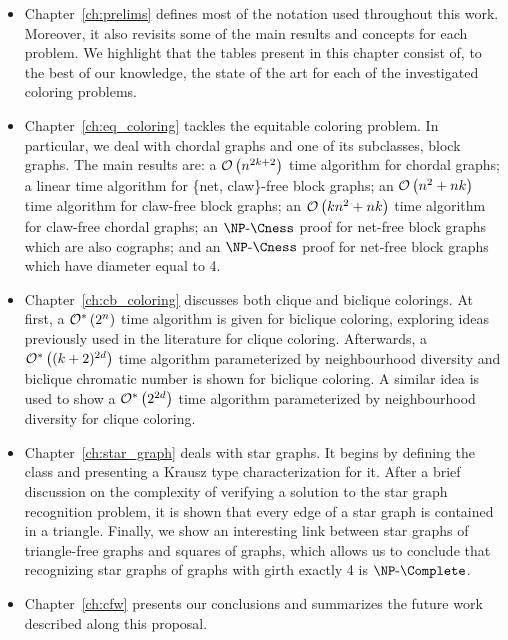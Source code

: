 \begin{itemize}
    \item Chapter~\ref{ch:prelims} defines most of the notation used throughout this work.
    Moreover, it also revisits some of the main results and concepts for each problem. 
    We highlight that the tables present in this chapter consist of, to the best of our knowledge, the state of the art for each of the investigated coloring problems.
    \item Chapter~\ref{ch:eq_coloring} tackles the equitable coloring problem. In particular, we deal with chordal graphs and one of its subclasses, block graphs.
    The main results are: a $\mathcal{O}\left(n^{2k+2}\right)$ time algorithm for chordal graphs;
    a linear time algorithm for \{net, claw\}-free block graphs;
    an $\mathcal{O}\left(n^2 + nk\right)$ time algorithm for claw-free block graphs;
    an $\mathcal{O}\left(kn^2 + nk\right)$ time algorithm for claw-free chordal graphs;
    an $\NPcness$ proof for net-free block graphs which are also cographs;
    and an $\NPcness$ proof for net-free block graphs which have diameter equal to 4.
    \item Chapter~\ref{ch:cb_coloring} discusses both clique and biclique colorings.
    At first, a $\mathcal{O}^*\left(2^n\right)$ time algorithm is given for biclique coloring, exploring ideas previously used in the literature for clique coloring.
    Afterwards, a $\mathcal{O}^*\left((k+2)^{2d}\right)$ time algorithm parameterized by neighbourhood diversity and biclique chromatic number is shown for biclique coloring.
    A similar idea is used to show a $\mathcal{O}^*\left(2^{2d}\right)$ time algorithm parameterized by neighbourhood diversity for clique coloring.
    \item Chapter~\ref{ch:star_graph} deals with star graphs.
    It begins by defining the class and presenting a Krausz type characterization for it.
    After a brief discussion on the complexity of verifying a solution to the star graph recognition problem, it is shown that every edge of a star graph is contained in a triangle.
    Finally, we show an interesting link between star graphs of triangle-free graphs and squares of graphs, which allows us to conclude that recognizing star graphs of graphs with girth exactly 4 is $\NPc$.
    \item Chapter~\ref{ch:cfw} presents our conclusions and summarizes the future work described along this proposal.
\end{itemize}
